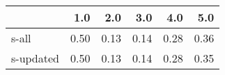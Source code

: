 \begin{tabular}{lrrrrr}
\toprule
{} &  1.0 &  2.0 &  3.0 &  4.0 &  5.0 \\
\midrule
s-all     & 0.50 & 0.13 & 0.14 & 0.28 & 0.36 \\
s-updated & 0.50 & 0.13 & 0.14 & 0.28 & 0.35 \\
\bottomrule
\end{tabular}
